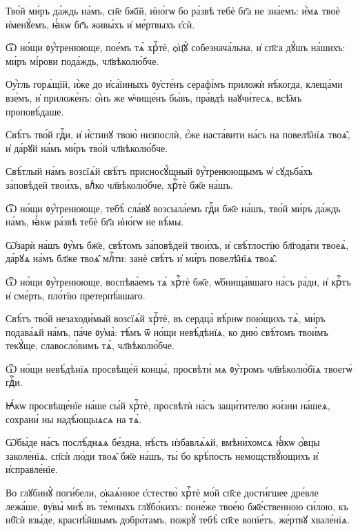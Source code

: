 \hKv Тво́й ми́ръ да́ждь на́мъ, сн҃е бж҃їй, и҆но́гѡ  бо ра́звѣ тебѐ бг҃а не зна́емъ: и҆́мѧ твоѐ и҆менꙋ́емъ, ꙗ҆́кѡ бг҃ъ  живы́хъ и҆ ме́ртвыхъ є҆сѝ. 
%

\hKv Ѿ но́щи ᲂу҆́тренююще, пое́мъ тѧ̀ хрⷭ҇тѐ, ѻ҆ц҃ꙋ̀  собезнача́льна, и҆ сп҃са дꙋ́шъ на́шихъ: ми́ръ мі́рови пода́ждь,  чл҃вѣколю́бче. 

\hKv Оу҆́гль горѧ́щїй, и҆́же до и҆са́їиныхъ ᲂу҆сте́нъ серафі́мъ  приложѝ нѣ́когда, клеща́ми взе́мъ,  и҆  приложе́нъ: ѻ҆́нъ же ѡ҆чище́нъ бы́въ, пра́вдѣ наꙋчи́тесѧ, всѣ̑мъ  проповѣ́даше. 

\hKv Свѣ́тъ тво́й гдⷭ҇и, и҆ и҆́стинꙋ твою̀ низпослѝ, є҆́же  наста́вити на́съ на повелѣ̑нїѧ твоѧ̑, и҆ да́рꙋй на́мъ ми́ръ тво́й  чл҃вѣколю́бче. 
%

\hKv Свѣ́тлый на́мъ возсїѧ́й свѣ́тъ присносꙋ́щный ᲂу҆́тренюющымъ ѡ҆  сꙋдьба́хъ за́повѣдей твои́хъ, влⷣко чл҃вѣколю́бче, хрⷭ҇тѐ бж҃е  на́шъ. 

\hKv Ѿ но́щи ᲂу҆́тренююще, тебѣ̀ сла́вꙋ возсыла́емъ гдⷭ҇и бж҃е  на́шъ, тво́й ми́ръ да́ждь на́мъ, ꙗ҆́кѡ ра́звѣ тебѐ бг҃а и҆но́гѡ не  вѣ́мы. 

\hKv Ѡ҆зарѝ на́шъ ᲂу҆́мъ бж҃е, свѣ́томъ за́повѣдей твои́хъ, и҆  свѣ́тлостїю бл҃года́ти твоеѧ̀, да́рꙋѧ на́мъ бл҃же твоѧ̑ млⷭ҇ти:  занѐ свѣ́тъ и҆ ми́ръ повелѣ̑нїѧ твоѧ̑. 

\hKv Ѿ но́щи ᲂу҆́тренююще, воспѣва́емъ тѧ̀ хрⷭ҇тѐ бж҃е,  ѡ҆бнища́вшаго на́съ ра́ди, и҆ крⷭ҇тъ и҆ сме́рть, пло́тїю  претерпѣ́вшаго. 

\hKv Свѣ́тъ тво́й незаходи́мый возсїѧ́й хрⷭ҇тѐ, въ сердца̀ вѣ́рнѡ  пою́щихъ тѧ̀, ми́ръ подава́ѧй  на́мъ, па́че  ᲂу҆ма̀: тѣ́мъ ѿ но́щи невѣ́дѣнїѧ, ко дню̀ свѣ́томъ твои́мъ  текꙋ́ще, славосло́вимъ тѧ̀, чл҃вѣколю́бче. 

\hKv Ѿ но́щи невѣ́дѣнїѧ просвѣще́й концы̀, просвѣти́ мѧ  ᲂу҆́тромъ чл҃вѣколю́бїѧ твоегѡ̀ гдⷭ҇и. 

\hKv Ꙗ҆́кѡ просвѣще́нїе на́ше сы́й хрⷭ҇тѐ, просвѣтѝ на́съ  защи́тителю жи́зни на́шеѧ, сохрани́ ны надѣ́ющыѧсѧ на тѧ̀. 
%

\hKv Ѡ҆бы́де на́съ послѣ́днѧѧ бе́здна, нѣ́сть и҆збавлѧ́ѧй,  вмѣни́хомсѧ ꙗ҆́кѡ ѻ҆́вцы заколе́нїѧ. сп҃сѝ лю́ди твоѧ̑ бж҃е  на́шъ, ты́ бо крѣ́пость немощствꙋ́ющихъ и҆ и҆справле́нїе. 

\hKv Во глꙋбинꙋ̀ поги́бели, ѻ҆каѧ́нное є҆стество̀ хрⷭ҇тѐ мо́й сп҃се  дости́гшее дре́вле лежа́ше, ᲂу҆вы̀ мнѣ̀ въ те́мныхъ глꙋбо́кихъ:  поне́же твое́ю бж҃е́ственною си́лою, къ нб҃сѝ взы́де,  краснѣ́йшымъ добро́тамъ, пожрꙋ̀ тебѣ̀ сп҃се  вопїе́тъ, же́ртвꙋ хвале́нїѧ. 
%

